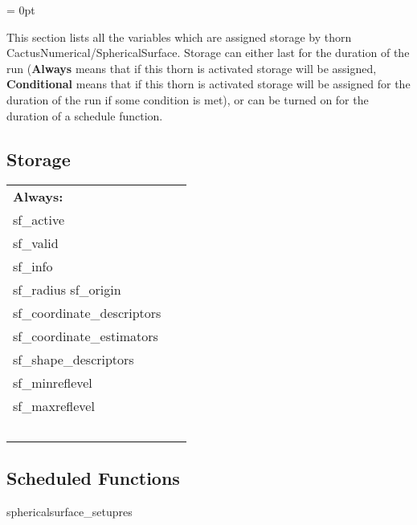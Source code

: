 \parskip = 0pt


\noindent This section lists all the variables which are assigned storage by thorn CactusNumerical/SphericalSurface.  Storage can either last for the duration of the run ({\bf Always} means that if this thorn is activated storage will be assigned, {\bf Conditional} means that if this thorn is activated storage will be assigned for the duration of the run if some condition is met), or can be turned on for the duration of a schedule function.


\subsection*{Storage}

\hspace{5mm}

 \begin{tabular*}{160mm}{ll} 

{\bf Always:}&  ~ \\ 
 sf\_active & ~\\ 
 sf\_valid & ~\\ 
 sf\_info & ~\\ 
 sf\_radius sf\_origin & ~\\ 
 sf\_coordinate\_descriptors & ~\\ 
 sf\_coordinate\_estimators & ~\\ 
 sf\_shape\_descriptors & ~\\ 
 sf\_minreflevel & ~\\ 
 sf\_maxreflevel & ~\\ 
~ & ~\\ 
\end{tabular*} 


\subsection*{Scheduled Functions}
\vspace{5mm}


\hspace{5mm} sphericalsurface\_setupres 

\hspace{5mm}{\it set surface resolution automatically } 


\hspace{5mm}

